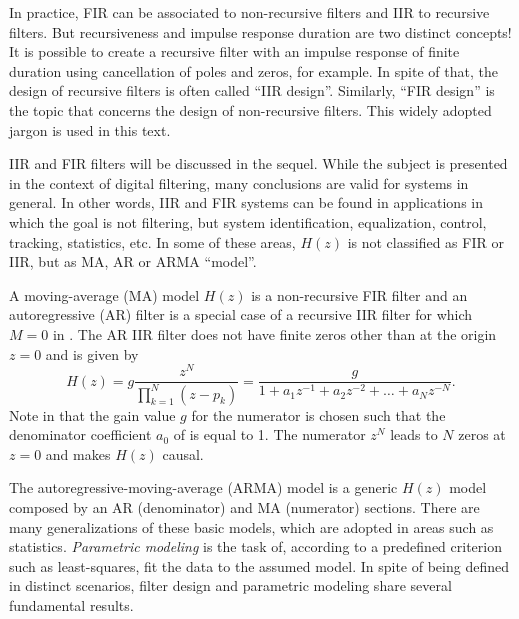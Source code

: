 In practice, FIR can be associated to non-recursive filters and IIR to recursive filters. But recursiveness and impulse response duration are two distinct concepts! It is possible to 
create a recursive filter with an impulse response of finite duration using cancellation of poles and zeros, for example.
In spite of that, the design of recursive filters is often called ``IIR design''. Similarly, ``FIR design'' is the
topic that concerns the design of non-recursive filters. This widely adopted jargon is used in this text.

IIR and FIR filters will be discussed in the sequel. While the subject is presented in the context of digital filtering, many conclusions are valid for systems in general. In other words, IIR and FIR systems can be found in applications in which the goal is not filtering, but system identification, equalization, control, tracking, statistics, etc. In some of these areas, $H(z)$ is not classified as FIR or IIR, but as MA, AR or ARMA ``model''.

A moving-average (MA) model $H(z)$ is a non-recursive FIR filter and an autoregressive (AR) filter is a special case of a recursive IIR filter for which $M=0$ in . The AR IIR filter does not have finite zeros other than at the origin $z=0$ and is given by
\begin{equation}
H(z) = g\frac{z^N}{\prod_{k=1}^N (z-p_k)} = \frac{g}{1+a_1 z^{-1} +a_2 z^{-2} + \ldots  +a_N z^{-N}}.
\label{eq:ar_model}
\end{equation}
Note in  that the gain value $g$ for the numerator is chosen such that the denominator coefficient $a_0$ of  is equal to 1. The numerator $z^N$ leads to $N$ zeros at $z=0$ and makes $H(z)$ causal.

The autoregressive-moving-average (ARMA) model is a generic $H(z)$ model composed by an AR (denominator) and MA (numerator) sections. There are many generalizations of these basic models, which are adopted in areas such as statistics. \emph{Parametric modeling} is the task of, according to a predefined criterion such as least-squares, fit the data to the assumed model. In spite of being defined in distinct scenarios, filter design and parametric modeling share several fundamental results.



